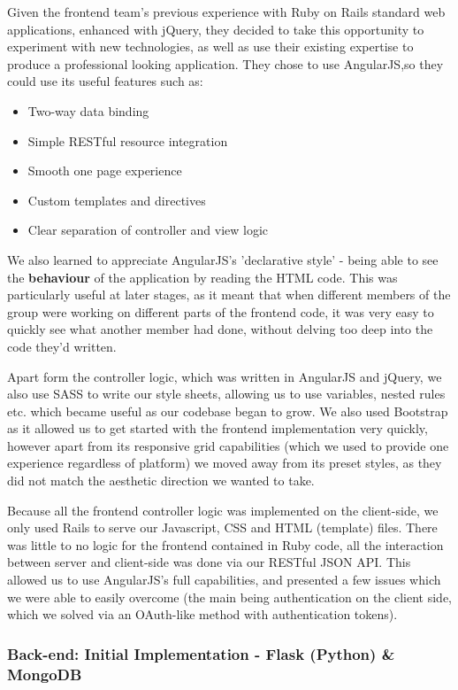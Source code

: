 \documentclass[a4paper, titlepage]{article}
\begin{document}
Given the frontend team's previous experience with Ruby on Rails standard web applications, enhanced with jQuery, they decided to take this opportunity to experiment with new technologies, as well as use their existing expertise to produce a professional looking application. They chose to use AngularJS,so they could use its useful features such as:
\begin{itemize}
\item Two-way data binding
\item Simple RESTful resource integration
\item Smooth one page experience
\item Custom templates and directives
\item Clear separation of controller and view logic
\end{itemize}

We also learned to appreciate AngularJS's 'declarative style' - being able to see the \textbf{behaviour} of the application by reading the HTML code. This was particularly useful at later stages, as it meant that when different members of the group were working on different parts of the frontend code, it was very easy to quickly see what another member had done, without delving too deep into the code they'd written.

Apart form the controller logic, which was written in AngularJS and jQuery, we also use SASS to write our style sheets, allowing us to use variables, nested rules etc. which became useful as our codebase began to grow. We also used Bootstrap as it allowed us to get started with the frontend implementation very quickly, however apart from its responsive grid capabilities (which we used to provide one experience regardless of platform) we moved away from its preset styles, as they did not match the aesthetic direction we wanted to take.

Because all the frontend controller logic was implemented on the client-side, we only used Rails to serve our Javascript, CSS and HTML (template) files. There was little to no logic for the frontend contained in Ruby code, all the interaction between server and client-side was done via our RESTful JSON API. This allowed us to use AngularJS's full capabilities, and presented a few issues which we were able to easily overcome (the main being authentication on the client side, which we solved via an OAuth-like method with authentication tokens).


\subsubsection{Back-end: Initial Implementation - Flask (Python) \& MongoDB}
\end{document}
